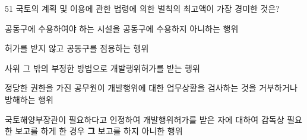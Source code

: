 \begin{question}{51}
국토의 계획 및 이용에 관한 법령에 의한 벌칙의 최고액이 가장 경미한 것은?
\begin{choices}
  \item 공동구에 수용하여야 하는 시설을 공동구에 수용하지 아니하는 행위
  \item 허가를 받지 않고 공동구를 점용하는 행위
  \item 사위 그 밖의 부정한 방법으로 개발행위허가를 받는 행위
  \item 정당한 권한을 가진 공무원이 개발행위에 대한 업무상황을 검사하는 것을 거부하거나 방해하는 행위
  \item 국토해양부장관이 필요하다고 인정하여 개발행위허가를 받은 자에 대하여 감독상 필요한 보고를 하게 한 경우 \textbf{그} 보고를 하지 아니한 행위
\end{choices}
\end{question}
